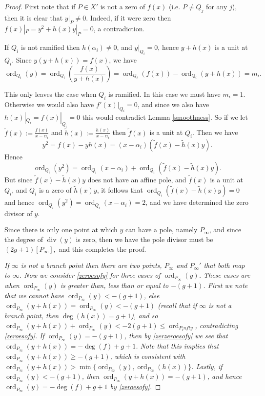 \documentclass[11pt]{article} %
\theoremstyle{plain}
\theoremstyle{remark}
\DeclareMathOperator{\ord}{ord}
\DeclareMathOperator{\di}{div}
\begin{document}
\begin{proof}
 First note that if $P\in X'$ is not a zero of $f(x)$ (i.e. $P\neq Q_j$ for any $j$), then it is clear that $y|_P \neq 0$.
 Indeed, if it were zero then $f(x)|_P = y^2 + h(x)y|_P = 0$, a contradiction.
 
 If $Q_i$ is not ramified then $h(\alpha_i) \neq 0$, and $y|_{Q_i} = 0$, hence $y+h(x)$ is a unit at $Q_i$.
 Since $y(y+h(x)) = f(x)$, we have
 \begin{equation*}\label{zeroesofy}
  \ord_{Q_i}(y) = \ord_{Q_i}\left(\frac{f(x)}{y+h(x)}\right) = \ord_{Q_i}(f(x)) -\ord_{Q_i}(y+h(x)) = m_i.
 \end{equation*}

 This only leaves the case when $Q_i$ is ramified. 
 In this case we must have $m_i=1$.
 Otherwise we would also have $f'(x)|_{Q_i} = 0$, and since we also have $h(x)|_{Q_i} = f(x)|_{Q_i} = 0$ this would contradict Lemma \ref{smoothness}.
 So if we let $\tilde f(x) := \frac{f(x)}{x-\alpha_i}$ and $\tilde h(x) := \frac{h(x)}{x-\alpha_i}$ then $\tilde f(x)$ is a unit at $Q_i$.
 Then we have \[y^2 = f(x) - yh(x) = (x-\alpha_i)(\tilde f(x) - \tilde h(x)y).\]
 Hence
 \begin{equation*}
   \ord_{Q_i}(y^2) = \ord_{Q_i}(x-\alpha_i) + \ord_{Q_i}(\tilde f(x) - \tilde h(x)y).
  \end{equation*}
But since $\tilde f(x) - \tilde h(x) y$ does not have an affine pole, and $\tilde f(x)$ is a unit at $Q_i$, and $Q_i$ is a zero of $\tilde h(x) y$, it follows that $\ord_{Q_i}(\tilde f(x) -  \tilde h(x) y) = 0$
and hence $\ord_{Q_i}(y^2) = \ord_{Q_i}(x-\alpha_i) = 2$, and we have determined the zero divisor of $y$.

Since there is only one point at which $y$ can have a pole, namely $P_\infty$, and since the degree of $\di (y)$ is zero, then we have the pole divisor must be
$
 (2g+1)[P_\infty],
$
and this completes the proof.

{\em If $\infty$ is not a branch point then there are two points, $P_\infty$ and $P_\infty'$ that both map to $\infty$.
Now we consider \eqref{zeroesofy} for three cases of $\ord_{P_\infty}(y)$.
These cases are when $\ord_{P_\infty}(y)$ is greater than, less than or equal to $-(g+1)$.
First we note that we cannot have $\ord_{P_\infty}(y) < -(g+1)$, else $\ord_{P_\infty}(y+h(x)) = \ord_{P_\infty}(y)< -(g+1)$ (recall that if $\infty$ is not a branch point, then $\deg(h(x)) = g+1$), and so $\ord_{P_\infty}(y+h(x)) + \ord_{P_\infty}(y) < -2(g+1) \leq \ord_{P_infty}$, contradicting \eqref{zeroesofy}.
If $\ord_{P_\infty} (y) = -(g+1)$, then by \eqref{zerzeroesofy} we see that $\ord_{P_\infty}(y+h(x)) = -\deg(f) +g+1$.
Note that this implies that $\ord_{P_\infty}(y+h(x)) \geq -(g+1)$, which is consistent with $\ord_{P_\infty}(y+h(x)) > \min\{\ord_{P_\infty}(y), \ord_{P_\infty}(h(x))\}$.
Lastly, if $\ord_{P_\infty}(y) < -(g+1)$, then $\ord_{P_\infty}(y+h(x)) = -(g+1)$, and hence $\ord_{P_\infty} (y) = -\deg(f) +g+1$ by \eqref{zeroesofy}.

}
\end{proof}
\end{document}
